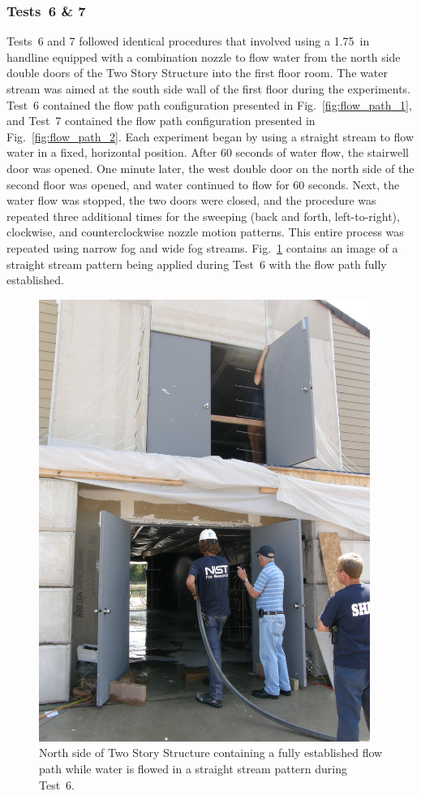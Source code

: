\documentclass[12pt,oneside]{book}
\begin{document}
\subsubsection{Tests~6 \& 7}
Tests~6 and 7 followed identical procedures that involved using a 1.75~in handline equipped with a combination nozzle to flow water from the north side double doors of the Two Story Structure into the first floor room. The water stream was aimed at the south side wall of the first floor during the experiments. Test~6 contained the flow path configuration presented in Fig.~\ref{fig:flow_path_1}, and Test~7 contained the flow path configuration presented in Fig.~\ref{fig:flow_path_2}. Each experiment began by using a straight stream to flow water in a fixed, horizontal position. After 60 seconds of water flow, the stairwell door was opened. One minute later, the west double door on the north side of the second floor was opened, and water continued to flow for 60 seconds. Next, the water flow was stopped, the two doors were closed, and the procedure was repeated three additional times for the sweeping (back and forth, left-to-right), clockwise, and counterclockwise nozzle motion patterns. This entire process was repeated using narrow fog and wide fog streams. Fig.~\ref{fig:test_6_pic} contains an image of a straight stream pattern being applied during Test~6 with the flow path fully established.

\begin{figure}[!ht]
	\includegraphics[width=4.25in]{../Figures/Pictures/Test_18}
	\caption[North side of Two Story Structure containing a fully established flow path during Test~6.]{North side of Two Story Structure containing a fully established flow path while water is flowed in a straight stream pattern during Test~6.}
	\label{fig:test_6_pic}
\end{figure}
\FloatBarrier
\end{document}
